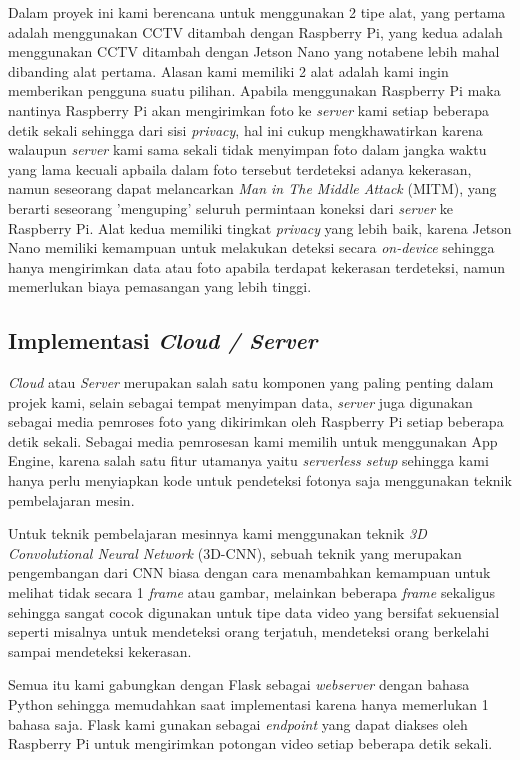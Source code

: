 Dalam proyek ini kami berencana untuk menggunakan 2 tipe alat, yang pertama adalah menggunakan CCTV ditambah dengan Raspberry Pi, yang kedua adalah menggunakan CCTV ditambah dengan Jetson Nano yang notabene lebih mahal dibanding alat pertama. Alasan kami memiliki 2 alat adalah kami ingin memberikan pengguna suatu pilihan. Apabila menggunakan Raspberry Pi maka nantinya Raspberry Pi akan mengirimkan foto ke \textit{server} kami setiap beberapa detik sekali sehingga dari sisi \textit{privacy}, hal ini cukup mengkhawatirkan karena walaupun \textit{server} kami sama sekali tidak menyimpan foto dalam jangka waktu yang lama kecuali apbaila dalam foto tersebut terdeteksi adanya kekerasan, namun seseorang dapat melancarkan \textit{Man in The Middle Attack} (MITM), yang berarti seseorang 'menguping' seluruh permintaan koneksi dari \textit{server} ke Raspberry Pi. Alat kedua memiliki tingkat \textit{privacy} yang lebih baik, karena Jetson Nano memiliki kemampuan untuk melakukan deteksi secara \textit{on-device} sehingga hanya mengirimkan data atau foto apabila terdapat kekerasan terdeteksi, namun memerlukan biaya pemasangan yang lebih tinggi.

\subsection{Implementasi \textit{Cloud / Server}}

\textit{Cloud} atau \textit{Server} merupakan salah satu komponen yang paling penting dalam projek kami, selain sebagai tempat menyimpan data, \textit{server} juga digunakan sebagai media pemroses foto yang dikirimkan oleh Raspberry Pi setiap beberapa detik sekali. Sebagai media pemrosesan kami memilih untuk menggunakan App Engine, karena salah satu fitur utamanya yaitu \textit{serverless setup} sehingga kami hanya perlu menyiapkan kode untuk pendeteksi fotonya saja menggunakan teknik pembelajaran mesin.

Untuk teknik pembelajaran mesinnya kami menggunakan teknik \textit{3D Convolutional Neural Network} (3D-CNN), sebuah teknik yang merupakan pengembangan dari CNN biasa dengan cara menambahkan kemampuan untuk melihat tidak secara 1 \textit{frame} atau gambar, melainkan beberapa \textit{frame} sekaligus sehingga sangat cocok digunakan untuk tipe data video yang bersifat sekuensial seperti misalnya untuk mendeteksi orang terjatuh, mendeteksi orang berkelahi sampai mendeteksi kekerasan.

Semua itu kami gabungkan dengan Flask sebagai \textit{webserver} dengan bahasa Python sehingga memudahkan saat implementasi karena hanya memerlukan 1 bahasa saja. Flask kami gunakan sebagai \textit{endpoint} yang dapat diakses oleh Raspberry Pi untuk mengirimkan potongan video setiap beberapa detik sekali.

